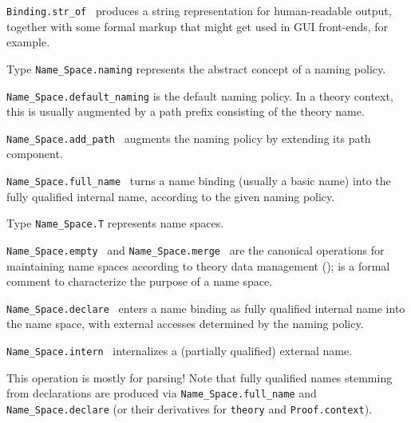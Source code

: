\begin{isabellebody}
\begin{isamarkuptext}
\begin{description}
  \item \verb|Binding.str_of|~ produces a string
  representation for human-readable output, together with some formal
  markup that might get used in GUI front-ends, for example.

  \item Type \verb|Name_Space.naming| represents the abstract
  concept of a naming policy.

  \item \verb|Name_Space.default_naming| is the default naming policy.
  In a theory context, this is usually augmented by a path prefix
  consisting of the theory name.

  \item \verb|Name_Space.add_path|~ augments the
  naming policy by extending its path component.

  \item \verb|Name_Space.full_name|~ turns a
  name binding (usually a basic name) into the fully qualified
  internal name, according to the given naming policy.

  \item Type \verb|Name_Space.T| represents name spaces.

  \item \verb|Name_Space.empty|~ and \verb|Name_Space.merge|~ are the canonical operations for
  maintaining name spaces according to theory data management
  ();  is a formal comment
  to characterize the purpose of a name space.

  \item \verb|Name_Space.declare|~ enters a name binding as fully qualified internal name into
  the name space, with external accesses determined by the naming
  policy.

  \item \verb|Name_Space.intern|~ internalizes a
  (partially qualified) external name.

  This operation is mostly for parsing!  Note that fully qualified
  names stemming from declarations are produced via \verb|Name_Space.full_name| and \verb|Name_Space.declare|
  (or their derivatives for \verb|theory| and
  \verb|Proof.context|).


\end{description}
\end{isamarkuptext}
\end{isabellebody}
